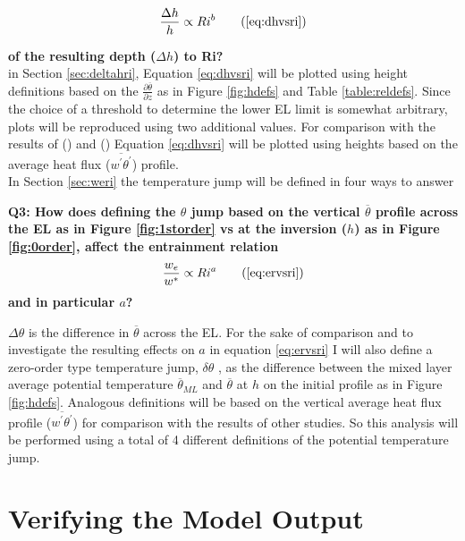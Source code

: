 \begin{equation}
\frac{\Delta h}{h} \propto Ri^{b}\tag{\ref{eq:dhvsri}}
\end{equation}

\textbf{of the resulting depth ($\Delta h$) to \acs{Ri}?}\\

in Section \ref{sec:deltahri}, Equation \ref{eq:dhvsri} will be plotted using height definitions based on the $\frac{\partial \overline{\theta}}{\partial z}$ as in Figure \ref{fig:hdefs} and Table \ref{table:reldefs}.  Since the choice of a threshold to determine the lower \acs{EL} limit is somewhat arbitrary, plots will be reproduced using two additional values. For comparison with the results of \citeauthor{FedConzMir04} (\citeyear{FedConzMir04}) and \citeauthor{BrooksFowler2} (\citeyear{BrooksFowler2}) Equation \ref{eq:dhvsri} will be plotted using heights based on the average heat flux ($\overline{w^{'}\theta^{'}}$) profile.\\   

In Section \ref{sec:weri} the temperature jump will be defined in four ways to answer 

\textbf{Q3: How does defining the $\theta$ jump based on the vertical $\overline{\theta}$ profile across the \acs{EL} as in Figure \ref{fig:1storder} vs at the inversion ($h$) as in Figure \ref{fig:0order}, affect the entrainment relation} 
\begin{equation}
\frac{w_{e}}{w^{*}} \propto Ri^{a} \tag{\ref{eq:ervsri}}
\end{equation}
\textbf{and in particular $a$?}

$\Delta \theta$ is the difference in $\overline{\theta}$ across the \acs{EL}.  For the sake of comparison and to investigate the resulting effects on $a$ in equation \ref{eq:ervsri} I will also define a zero-order type temperature jump, $\delta \theta$ , as the difference between the mixed layer average potential temperature $\overline{\theta}_{ML}$ and $\overline{\theta}$ at $h$ on the initial profile as in Figure \ref{fig:hdefs}.  Analogous definitions will be based on the vertical average heat flux profile ($\overline{w^{'}\theta^{'}}$) for comparison with the results of other studies. So this analysis will be performed using a total of 4 different definitions of the potential temperature jump. 
\\ 

\clearpage

\section{Verifying the Model Output}
\label{sec:CheckingtheModel}
